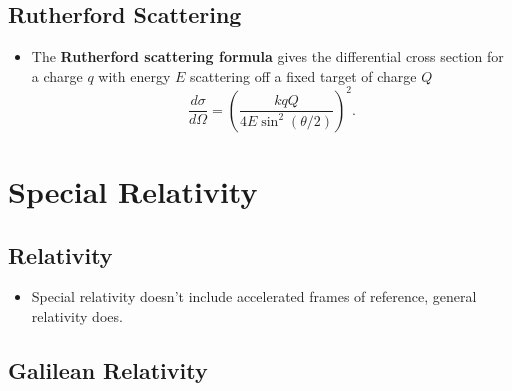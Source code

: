 \documentclass{article}
\begin{document}
\subsection{Rutherford Scattering}

\begin{itemize}
  \item The \textbf{Rutherford scattering formula} gives the differential cross section for a charge $q$ with energy $E$ scattering off a fixed target of charge $Q$ \[\frac{d \sigma}{d \Omega} = \left( \frac{k q Q}{4 E \sin^2 (\theta / 2)} \right)^2.\]
\end{itemize}

\section{Special Relativity}

\subsection{Relativity}

\begin{itemize}
  \item Special relativity doesn't include accelerated frames of reference, general relativity does.
\end{itemize}

\subsection{Galilean Relativity}
\end{document}
